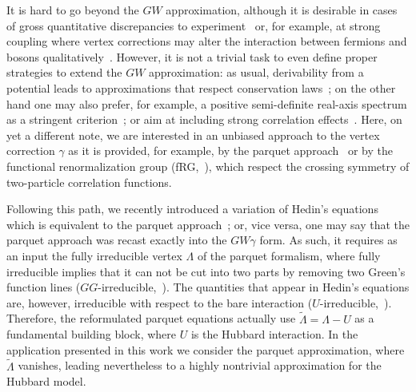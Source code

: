 \documentclass[epj]{svjour}
\begin{document}
It is hard to go beyond the $GW$ approximation, although it is desirable in cases of gross quantitative discrepancies
to experiment~\cite{Kutepov16} or, for example, at strong coupling where vertex corrections may alter the interaction between fermions and bosons qualitatively~\cite{Krien21}. However, it is not a trivial task to even define proper strategies to extend the $GW$ approximation:
as usual, derivability from a potential leads to approximations that respect conservation laws~\cite{Almbladh99}; on the other hand 
one may also prefer, for example, a positive semi-definite real-axis spectrum as a stringent criterion~\cite{Leeuwen14,Leeuwen16}; or aim at including strong correlation effects~\cite{Biermann03,Ayral15}.
Here, on yet a different note, we are interested in an unbiased approach to the vertex correction $\gamma$ as it is provided, for example, by the parquet approach~\cite{Diatlov57,Dominicis64-2} or by the functional renormalization group (fRG,~\cite{Metzner12,Dupuis21}), which respect the crossing symmetry of two-particle correlation functions.

Following this path, we recently introduced a variation of Hedin's equations
which is equivalent to the parquet approach~\cite{Krien21-2};
or, vice versa, one may say that the parquet approach was recast exactly into the $GW\gamma$ form.
As such, it requires as an input the fully irreducible vertex $\Lambda$ of the parquet formalism,
where fully irreducible implies that it can not be cut
into two parts by removing two Green's function lines ($GG$-irreducible,~\cite{Rohringer12}).
The quantities that appear in Hedin's equations are, however, 
irreducible with respect to the bare interaction ($U$-irreducible,~\cite{Krien21-2}).
Therefore, the reformulated parquet equations actually use $\tilde{\Lambda}=\Lambda-U$ as a fundamental building block,
where $U$ is the Hubbard interaction. In the application presented in this work we consider the parquet approximation,
where $\tilde{\Lambda}$ vanishes, leading nevertheless to a highly nontrivial approximation for the Hubbard model.
\end{document}
